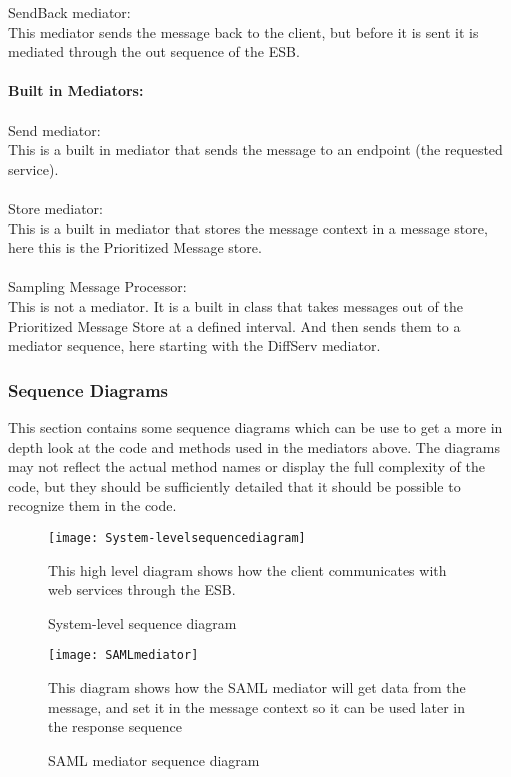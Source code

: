 SendBack mediator:\\
    This mediator sends the message back to the client, but before it is sent it is mediated through the out sequence of the ESB.
\\\\
\textbf{Built in Mediators:}\\\\
Send mediator:\\
    This is a built in mediator that sends the message to an endpoint (the requested service).
\\\\
Store mediator:\\
    This is a built in mediator that stores the message context in a message store, here this is the Prioritized Message store.
\\\\
Sampling Message Processor:\\
    This is not a mediator. It is a built in class that takes messages out of the Prioritized Message Store at a defined interval. And then sends them to a mediator sequence, here starting with the DiffServ mediator.

    \subsubsection{Sequence Diagrams}\label{Server Sequence Diagrams}
    This section contains some sequence diagrams which can be use to get a more in depth look at the code and methods used in the mediators above. The diagrams may not reflect the actual method names or display the full complexity of the code, but they should be sufficiently detailed that it should be possible to recognize them in the code.
    
        \begin{figure}[H]
            \centering
            \texttt{[image: System-levelsequencediagram]}
            \caption{System-level sequence diagram}
            This high level diagram shows how the client communicates with web services through the ESB.
            \label{fig:System-levelsequencediagram}
        \end{figure}
        
        \begin{figure}[H] 
            \centering
            \texttt{[image: SAMLmediator]}
            \caption{SAML mediator sequence diagram}
            This diagram shows how the SAML mediator will get data from the message, and set it in the message context so it can be used later in the response sequence
            \label{fig:SAMLmediator}
        \end{figure}
        

